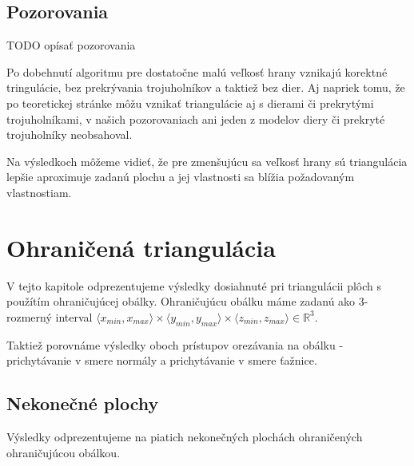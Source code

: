 \begin{enumerate}
{}
     

\end{enumerate}

\newpage
\subsection{Pozorovania}
TODO opísať pozorovania

Po dobehnutí algoritmu pre dostatočne malú veľkosť hrany vznikajú korektné tringulácie,
bez prekrývania trojuholníkov a taktiež bez dier. Aj napriek tomu, že po teoretickej stránke
môžu vznikať triangulácie aj s dierami či prekrytými trojuholníkami, 
v našich pozorovaniach ani jeden z modelov diery či prekryté trojuholníky neobsahoval.

Na výsledkoch môžeme vidieť, že pre zmenšujúcu sa veľkosť hrany sú triangulácia lepšie 
aproximuje zadanú plochu a jej vlastnosti sa blížia požadovaným vlastnostiam.

\section{Ohraničená triangulácia}

V tejto kapitole odprezentujeme výsledky dosiahnuté pri triangulácii plôch s použítím 
ohraničujúcej obálky. Ohraničujúcu obálku máme zadanú ako $3$-rozmerný interval 
$\langle x_{min}, x_{max}\rangle
\times \langle y_{min}, y_{max}\rangle \times \langle z_{min}, z_{max}\rangle \in \mathbb{R}^3.$ 

Taktiež porovnáme výsledky oboch prístupov orezávania na obálku - prichytávanie v smere normály
a prichytávanie v smere ťažnice.

\subsection{Nekonečné plochy}

Výsledky odprezentujeme na piatich nekonečných plochách ohraničených ohraničujúcou obálkou.

